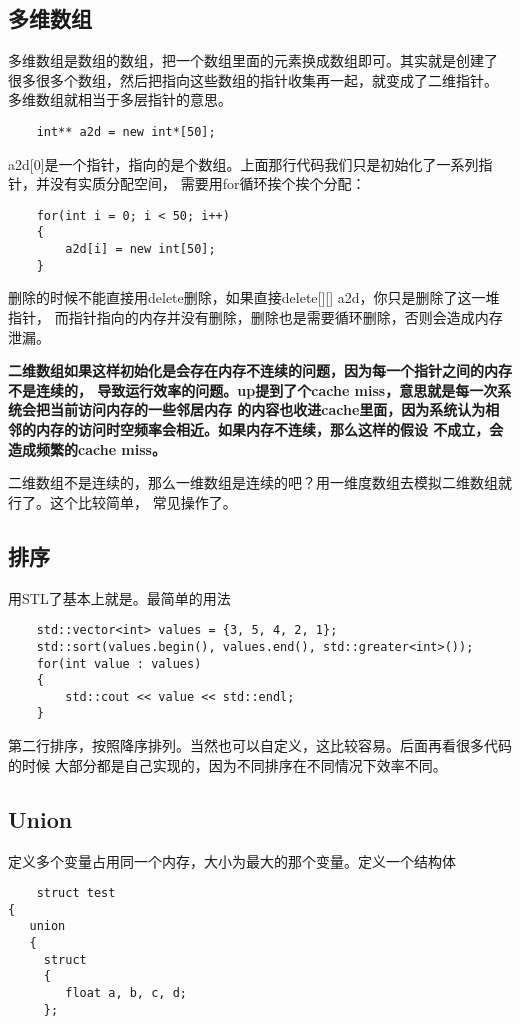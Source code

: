 \documentclass{article}
\begin{document}
\begin{sloppypar}
\subsection{多维数组}
多维数组是数组的数组，把一个数组里面的元素换成数组即可。其实就是创建了
很多很多个数组，然后把指向这些数组的指针收集再一起，就变成了二维指针。
多维数组就相当于多层指针的意思。
\begin{lstlisting}
	int** a2d = new int*[50];
\end{lstlisting}
a2d[0]是一个指针，指向的是个数组。上面那行代码我们只是初始化了一系列指针，并没有实质分配空间，
需要用for循环挨个挨个分配：
\begin{lstlisting}
	for(int i = 0; i < 50; i++)
    {
        a2d[i] = new int[50];
    }
\end{lstlisting}
删除的时候不能直接用delete删除，如果直接delete[][] a2d，你只是删除了这一堆指针，
而指针指向的内存并没有删除，删除也是需要循环删除，否则会造成内存泄漏。

\textbf{二维数组如果这样初始化是会存在内存不连续的问题，因为每一个指针之间的内存不是连续的，
导致运行效率的问题。up提到了个cache miss，意思就是每一次系统会把当前访问内存的一些邻居内存
的内容也收进cache里面，因为系统认为相邻的内存的访问时空频率会相近。如果内存不连续，那么这样的假设
不成立，会造成频繁的cache miss。}

二维数组不是连续的，那么一维数组是连续的吧？用一维度数组去模拟二维数组就行了。这个比较简单，
常见操作了。

\subsection{排序}
用STL了基本上就是。最简单的用法
\begin{lstlisting}
	std::vector<int> values = {3, 5, 4, 2, 1};
    std::sort(values.begin(), values.end(), std::greater<int>());
    for(int value : values)
    {
        std::cout << value << std::endl;
    }
\end{lstlisting}
第二行排序，按照降序排列。当然也可以自定义，这比较容易。后面再看很多代码的时候
大部分都是自己实现的，因为不同排序在不同情况下效率不同。

\subsection{Union}
定义多个变量占用同一个内存，大小为最大的那个变量。定义一个结构体
\begin{lstlisting}
	struct test
{
   union
   {
     struct
     {
        float a, b, c, d;
     };


\end{lstlisting}
\end{sloppypar}
\end{document}
